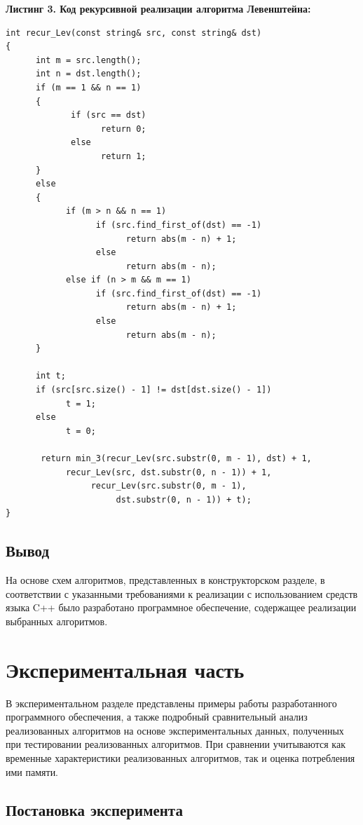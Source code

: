 \documentclass{article}
\begin{document}
\newpage
\small \textbf{Листинг 3. Код рекурсивной реализации алгоритма Левенштейна:} \normalsize
\begin{verbatim}
int recur_Lev(const string& src, const string& dst)
{
      int m = src.length();
      int n = dst.length();
      if (m == 1 && n == 1)
      {
             if (src == dst)
                   return 0;
             else
                   return 1;
      }
      else
      {
            if (m > n && n == 1)
                  if (src.find_first_of(dst) == -1)
                        return abs(m - n) + 1;
                  else
                        return abs(m - n);
            else if (n > m && m == 1)
                  if (src.find_first_of(dst) == -1)
                        return abs(m - n) + 1;
                  else
                        return abs(m - n);
      }

      int t;
      if (src[src.size() - 1] != dst[dst.size() - 1])
            t = 1;
      else
            t = 0;

       return min_3(recur_Lev(src.substr(0, m - 1), dst) + 1, 
            recur_Lev(src, dst.substr(0, n - 1)) + 1, 
                 recur_Lev(src.substr(0, m - 1), 
                      dst.substr(0, n - 1)) + t);
}
\end{verbatim}

\subsection{Вывод}
\label{sec:technologicalt:conclusion}
На основе схем алгоритмов, представленных в конструкторском разделе, в соответствии с указанными требованиями к реализации с использованием средств языка C++ было разработано программное обеспечение, содержащее реализации выбранных алгоритмов.

\newpage
\section{Экспериментальная часть}
\label{sec:experiment}
В экспериментальном разделе представлены примеры работы разработанного программного обеспечения, а также подробный сравнительный анализ реализованных алгоритмов на основе экспериментальных данных, полученных при тестировании реализованных алгоритмов. При сравнении учитываются как временные характеристики реализованных алгоритмов, так и оценка потребления ими памяти.

\subsection{Постановка эксперимента}
\label{sec:experiment:exp}
\end{document}
